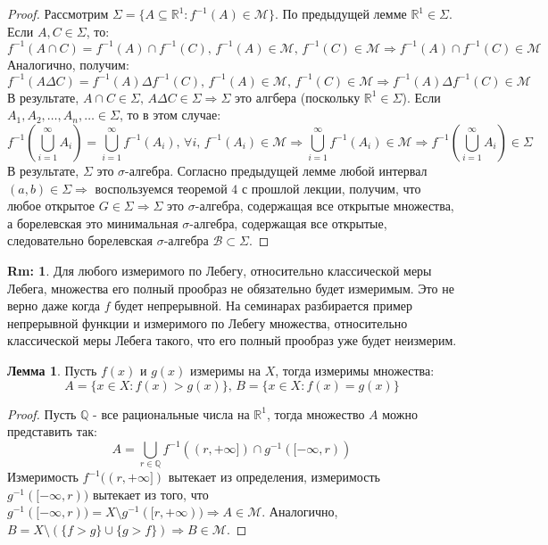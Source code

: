 \documentclass[12pt]{article}
\newcommand{\MR}{\mathbb{R}}
\newcommand{\MQ}{\mathbb{Q}}
\newcommand{\MB}{\mathcal{B}}
\newcommand{\MM}{\mathcal{M}}
\theoremstyle{definition}
\newtheorem{rem}{Rm:}
\newtheorem{lemma}{Лемма}
\begin{document}
\begin{proof}
	Рассмотрим $\Sigma = \{A \subseteq \MR^1 \colon f^{-1}(A) \in \MM\}$. По предыдущей лемме $\MR^1 \in \Sigma$. Если $A, C \in \Sigma$, то:
	$$
		f^{-1}(A \cap C) = f^{-1}(A) \cap f^{-1}(C), \,  f^{-1}(A) \in \MM, \, f^{-1}(C) \in \MM \Rightarrow f^{-1}(A) \cap f^{-1}(C) \in \MM
	$$
	Аналогично, получим:
	$$
		f^{-1}(A \Delta C) = f^{-1}(A) \Delta f^{-1}(C) , \,  f^{-1}(A) \in \MM, \, f^{-1}(C) \in \MM \Rightarrow f^{-1}(A) \Delta f^{-1}(C) \in \MM
	$$
	В результате, $A\cap C\in \Sigma, \, A \Delta C \in \Sigma \Rightarrow \Sigma$ это алгбера (поскольку $\MR^1 \in \Sigma$). Если $A_1, A_2, \dotsc, A_n, \dotsc  \in \Sigma$, то в этом случае:
	$$
		f^{-1}\left(\bigcup\limits_{i = 1}^{\infty} A_i\right) = \bigcup\limits_{i = 1}^{\infty} f^{-1}\left(A_i\right), \, \forall i, \, f^{-1}(A_i) \in \MM \Rightarrow \bigcup\limits_{i = 1}^{\infty} f^{-1}\left(A_i\right) \in \MM \Rightarrow f^{-1}\left(\bigcup\limits_{i = 1}^{\infty} A_i\right) \in \Sigma
	$$
	В результате, $\Sigma$ это $\sigma$-алгебра. Согласно предыдущей лемме любой интервал $(a,b) \in \Sigma \Rightarrow$ воспользуемся теоремой $4$ с прошлой лекции, получим, что любое открытое $G \in \Sigma \Rightarrow \Sigma$ это $\sigma$-алгебра, содержащая все открытые множества, а борелевская это минимальная $\sigma$-алгебра, содержащая все открытые, следовательно борелевская $\sigma$-алгебра $\MB \subset \Sigma$.
\end{proof}
\begin{rem}
	Для любого измеримого по Лебегу, относительно классической меры Лебега, множества его полный прообраз не обязательно будет измеримым. Это не верно даже когда $f$ будет непрерывной. На семинарах разбирается пример непрерывной функции и измеримого по Лебегу множества, относительно классической меры Лебега такого, что его полный прообраз уже будет неизмерим.
\end{rem}

\begin{lemma}
	Пусть $f(x)$ и $g(x)$ измеримы на $X$, тогда измеримы множества:
	$$
		A = \{x \in X \colon f(x) > g(x)\}, \, B = \{x\in X \colon f(x) = g(x)\}
	$$
\end{lemma}
\begin{proof}
	Пусть $\MQ$ - все рациональные числа на $\MR^1$, тогда множество $A$ можно представить так:
	$$
		A = \bigcup\limits_{r \in \MQ}f^{-1}((r,+\infty]) \cap g^{-1}([-\infty,r))
	$$
	Измеримость $f^{-1}((r,+\infty])$ вытекает из определения, измеримость $g^{-1}([-\infty,r))$ вытекает из того, что $g^{-1}([-\infty,r)) = X \setminus g^{-1}([r,+\infty)) \Rightarrow A \in \MM$. Аналогично, $B = X \setminus  (\{f > g\} \cup \{g > f\}) \Rightarrow B \in \MM$.
\end{proof}
\end{document}
